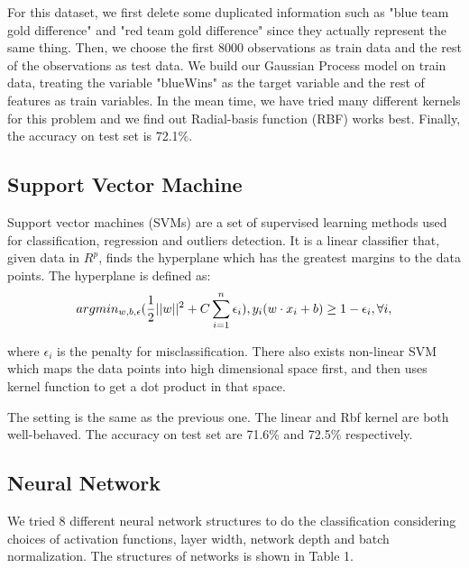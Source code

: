 \documentclass{article}
\begin{document}
For this dataset, we first delete some duplicated information such as "blue team gold difference" and "red team gold difference" since they actually represent the same thing. Then, we choose the first 8000 observations as train data and the rest of the observations as test data. We build our Gaussian Process model on train data, treating the variable "blueWins" as the target variable and the rest of features as train variables. In the mean time, we have tried many different kernels for this problem and we find out Radial-basis function (RBF) works best. Finally, the accuracy on test set is 72.1\%.

\subsection{Support Vector Machine}
Support vector machines (SVMs) are a set of supervised learning methods used for classification, regression and outliers detection. It is a linear classifier that, given data in $R^p$, finds the hyperplane which has the greatest margins to the data points. The hyperplane is defined as:
$$ argmin_{w,b,\epsilon}(\frac{1}{2}||w||^2+C\sum_{i=1}^{n}\epsilon_{i}), \space y_{i}(w \cdot x_{i}+b)\ge 1-\epsilon_{i},\space \forall i, $$

where $\epsilon_{i}$ is the penalty for misclassification. There also exists non-linear SVM which maps the data points into high dimensional space first, and then uses kernel function to get a dot product in that space.

The setting is the same as the previous one. The linear and Rbf kernel are both well-behaved. The accuracy on test set are 71.6\% and 72.5\% respectively.

\subsection{Neural Network}
We tried 8 different neural network structures to do the classification considering choices of activation functions, layer width, network depth and batch normalization. The structures of networks is shown in Table 1.
\end{document}

